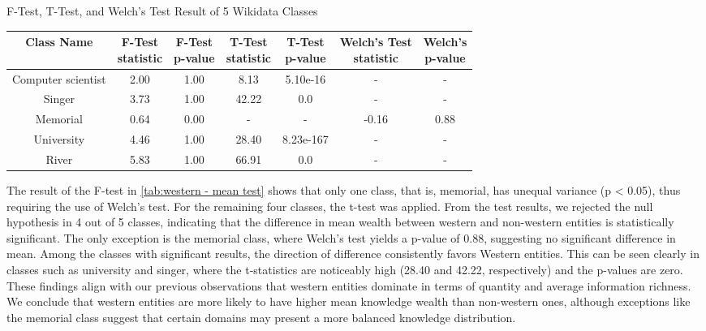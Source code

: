 
\begin{center}
\scriptsize
\begin{threeparttable}
\captionsetup{font=small}
\caption{F-Test, T-Test, and Welch's Test Result of 5 Wikidata Classes}
\label{tab:western - mean test}
\begin{tabular}{c | c c c c c c} 
\toprule
    Class Name & \CellWithForceBreak{F-Test \\ statistic} & \CellWithForceBreak{F-Test \\ p-value} & \CellWithForceBreak{T-Test \\ statistic} & \CellWithForceBreak{T-Test \\ p-value} & \CellWithForceBreak{Welch's Test \\ statistic} & \CellWithForceBreak{Welch's \\ p-value} \\ [0.5ex] 
\midrule
    Computer scientist & 2.00 & 1.00 & 8.13 & 5.10e-16 & - & - \\
    Singer & 3.73 & 1.00 & 42.22 & 0.0 & - & - \\
    Memorial & 0.64 & 0.00 & - & - & -0.16 & 0.88 \\
    University & 4.46 & 1.00 & 28.40 & 8.23e-167 & - & - \\
    River & 5.83 & 1.00 & 66.91 & 0.0 & - & - \\
 [1ex]
\bottomrule
\end{tabular}
\begin{tablenotes}
    \scriptsize
    \item{}
\end{tablenotes}
\end{threeparttable}
\end{center}

The result of the F-test in \autoref{tab:western - mean test} shows that only one class, that is, memorial, has unequal variance (p < 0.05), thus requiring the use of Welch's test. For the remaining four classes, the t-test was applied. From the test results, we rejected the null hypothesis in 4 out of 5 classes, indicating that the difference in mean wealth between western and non-western entities is statistically significant. The only exception is the memorial class, where Welch's test yields a p-value of 0.88, suggesting no significant difference in mean. Among the classes with significant results, the direction of difference consistently favors Western entities. This can be seen clearly in classes such as university and singer, where the t-statistics are noticeably high (28.40 and 42.22, respectively) and the p-values are zero. These findings align with our previous observations that western entities dominate in terms of quantity and average information richness. We conclude that western entities are more likely to have higher mean knowledge wealth than non-western ones, although exceptions like the memorial class suggest that certain domains may present a more balanced knowledge distribution.

